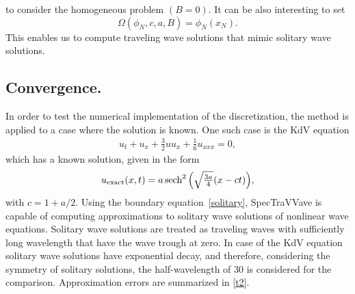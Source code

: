 	 to consider the homogeneous problem $(B=0)$.
	It can be also interesting to set
\begin{equation}
	\Omega(\phi_N, c, a, B) = \phi_N(x_N). \label{solitary}
\end{equation}
	 This enables us to compute traveling wave solutions that mimic solitary wave solutions. 	


\subsection{Convergence.}
In order to test the numerical implementation of the discretization,
the method is applied to a case where the solution is known.
One such case is the KdV equation
\begin{align*}
u_t + u_x + \frac{3}{2} u u_x + \frac{1}{6}u_{xxx} = 0, 
\end{align*}
which has a known solution, given in the form
\begin{align*}
u_{\mathrm{exact}}(x,t) = a \operatorname{sech}^2\Big( {\textstyle\sqrt{\frac{3a}{4}}} (x-c t)\Big),\\
\end{align*}
with $c=1+a/2$.
%
Using the boundary equation~\eqref{solitary}, \textsf{SpecTraVVave} is capable of computing 
approximations to solitary wave solutions of nonlinear wave equations. 
Solitary wave solutions are treated as traveling waves with sufficiently long wavelength 
that have the wave trough at zero.
In case of the KdV equation solitary wave solutions have exponential decay, 
and therefore, considering the symmetry of solitary solutions, 
the half-wavelength of $30$ is considered for the comparison. 
Approximation errors are summarized in \autoref{t2}.
%
